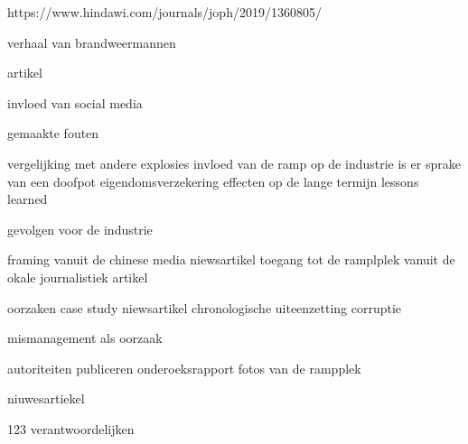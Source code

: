 {{https://www.hindawi.com/journals/joph/2019/1360805/ 
\cite{jiang16042019TanjinExplosion}

verhaal van brandweermannen

\cite{staff31082015tanjinblastunrevealed}
artikel

\cite{chinafile18082015tanjinexplosion}
invloed van social media

\cite{pinghuang2410201TanjinFactreport}

gemaakte fouten
\cite{portoTanjinExplosionSight}

\cite{imago17082015TanjinApartmentImages}
\cite{trager14082015Chemicalblast}
\cite{pangeramo27082015TanjinExplosion}
vergelijking met andere explosies
\cite{ap06082020ammaniumnitrate}
invloed van de ramp op de industrie
\cite{morris14082015TanjinIndustryImpact}
is er sprake van een doofpot
\cite{milesyu20082015exposingtoxicgovlines}
eigendomsverzekering
\cite{artemis30032016tanjininsurance}
\cite{aidenxiatanjinblast}
effecten op de lange termijn
\cite{danwangTanjinflexreport}
\cite{keyHighlightsTanjin}
lessons learned


\cite{hartley13082015videofootage}
\cite{odonnel01062017firetanjinblast2015}
gevolgen voor de industrie

\cite{fan15082015newyorkermistrustchina}
framing vanuit de chinese media
\cite{yanlidongchinamediaframingTanjin}
\cite{evans27092017TnjinInsurance}
niewsartikel
\cite{jasi26032019chineschemplant}
\cite{shiqingTanjinExecutiveSentence}
toegang tot de ramplplek vanuit de okale journalistiek
\cite{sophiebeach15082015}
artikel

\cite{hamzeh05082020BeirutBlast}
\cite{chemwatch18082015TanjiinExplosion}
\cite{thehindu15062019chinaExplosion}
\cite{santagotimes24032019chinablast}
oorzaken
\cite{klingecorp28042020causedTanjin}
case study
\cite{mcgarryExplosions2017}
niewsartikel
\cite{roswnfeld13082015TanjinReports}
chronologische uiteenzetting
\cite{aria12082015explosionaTanjin}
corruptie

mismanagement als oorzaak

autoriteiten publiceren onderoeksrapport
\cite{tremblay11022016chineseInvestigatorsTanjin}
fotos van de rampplek
\cite{taylor13082015TanjinExplosianAftermath}

niuwesartiekel
\cite{associatedPresss13082013}

\cite{un20082015InvestigationTanjin}
\cite{france2412082015TnjinExplosion}
\cite{npr14082015TanjinCause}
123 verantwoordelijken
\cite{bbc05022016TanjinResponsibles}

}}

